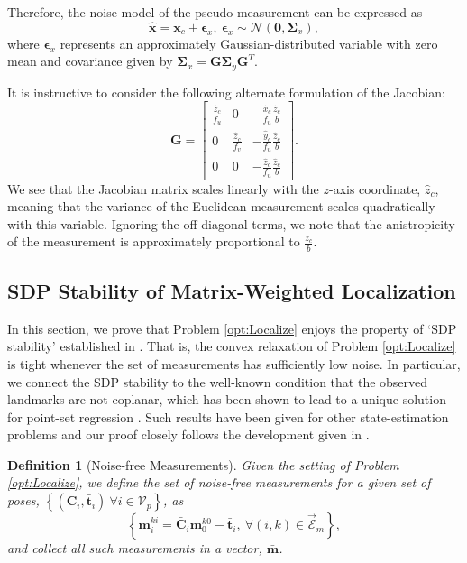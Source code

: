\documentclass[lettersize,journal]{IEEEtran}
\newcommand{\EdgeSet}{\vec{\bm{\mathcal{E}}}}
\newcommand{\VertSetP}{\bm{\mathcal{V}}_p}
\newtheorem{definition}[theorem]{Definition}
\begin{document}
Therefore, the noise model of the pseudo-measurement can be expressed as
\begin{equation}
	 \hat{\bm{x}} = \bm{x}_c + \bm{\epsilon}_x, ~ \bm{\epsilon}_x \sim \mathcal{N}(\bm{0}, \bm{\Sigma}_x),
\end{equation}
where $ \bm{\epsilon}_x $ represents an approximately Gaussian-distributed variable with zero mean and covariance given by $ \bm{\Sigma}_x = \bm{G}\bm{\Sigma}_y \bm{G}^T $.

It is instructive to consider the following alternate formulation of the Jacobian:
\begin{equation}\label{eqn:stereo_jac}
	\bm{G} =\begin{bmatrix}
		\frac{\hat{z}_c}{f_u} & 0 & -\frac{\hat{x}_c}{f_u }\frac{\hat{z}_c}{b} \\
		0 & \frac{\hat{z}_c}{f_v } & -\frac{\hat{y}_c}{f_u }\frac{\hat{z}_c}{b} \\
		0 & 0 & -\frac{\hat{z}_c}{f_u}\frac{\hat{z}_c}{b}
	\end{bmatrix}.
\end{equation}
We see that the Jacobian matrix scales linearly with the $z$-axis coordinate, $\hat{z}_c$, meaning that the variance of the Euclidean measurement scales quadratically with this variable. Ignoring the off-diagonal terms, we note that the anistropicity of the measurement is approximately proportional to $\frac{\hat{z}_c}{b}$.

\subsection{SDP Stability of Matrix-Weighted Localization}\label{App:SDPStability}

In this section, we prove that Problem \eqref{opt:Localize} enjoys the property of `SDP stability' established in \cite{cifuentesLocalStabilitySemidefinite2022}. That is, the convex relaxation of Problem \eqref{opt:Localize} is tight whenever the set of measurements has sufficiently low noise. In particular, we connect the SDP stability to the well-known condition that the observed landmarks are not coplanar, which has been shown to lead to a unique solution for point-set regression \cite{arunLeastSquaresFittingTwo1987}. Such results have been given for other state-estimation problems \cite{rosenSESyncCertifiablyCorrect2019, tianDistributedCertifiablyCorrect2021} and our proof closely follows the development given in \cite{wiseCertifiablyOptimalMonocular2020}.

\begin{definition}[Noise-free Measurements]
	Given the setting of Problem \eqref{opt:Localize}, we define the set of \emph{noise-free measurements} for a given set of poses, $\left\{(\bar{\bm{C}}_{i}, \bar{\bm{t}}_i) ~ \forall i \in \VertSetP \right\}$, as
	\begin{equation}
		\left\{\bar{\bm{m}}_i^{ki} = \bar{\bm{C}}_{i} \bm{m}_0^{k0} - \bar{\bm{t}}_i,~ \forall (i,k)\in \EdgeSet_m\right\},
	\end{equation}
	and collect all such measurements in a vector, $\bar{\bm{m}}$.
\end{definition}
\end{document}

